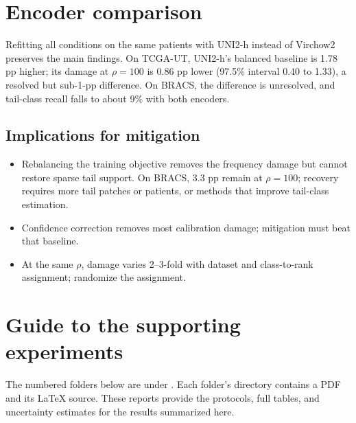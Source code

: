 \documentclass[11pt]{article}
\begin{document}
\section{Encoder comparison}
Refitting all conditions on the same patients with UNI2-h \citep{chen2024uni} instead of Virchow2 preserves the main findings. On TCGA-UT, UNI2-h's balanced baseline is 1.78 pp higher; its damage at $\rho=100$ is 0.86 pp lower (97.5\% interval 0.40 to 1.33), a resolved but sub-1-pp difference. On BRACS, the difference is unresolved, and tail-class recall falls to about 9\% with both encoders.

\begin{samepage}
\section{Implications for mitigation}
\begin{itemize}\setlength{\itemsep}{1pt}
\item Rebalancing the training objective removes the frequency damage but cannot restore sparse tail support. On BRACS, 3.3 pp remain at $\rho=100$; recovery requires more tail patches or patients, or methods that improve tail-class estimation.
\item Confidence correction removes most calibration damage; mitigation must beat that baseline.
\item At the same $\rho$, damage varies 2--3-fold with dataset and class-to-rank assignment; randomize the assignment.
\end{itemize}
\end{samepage}

\appendix
\section{Guide to the supporting experiments}
The numbered folders below are under . Each folder's  directory contains a PDF and its LaTeX source. These reports provide the protocols, full tables, and uncertainty estimates for the results summarized here.
\end{document}
